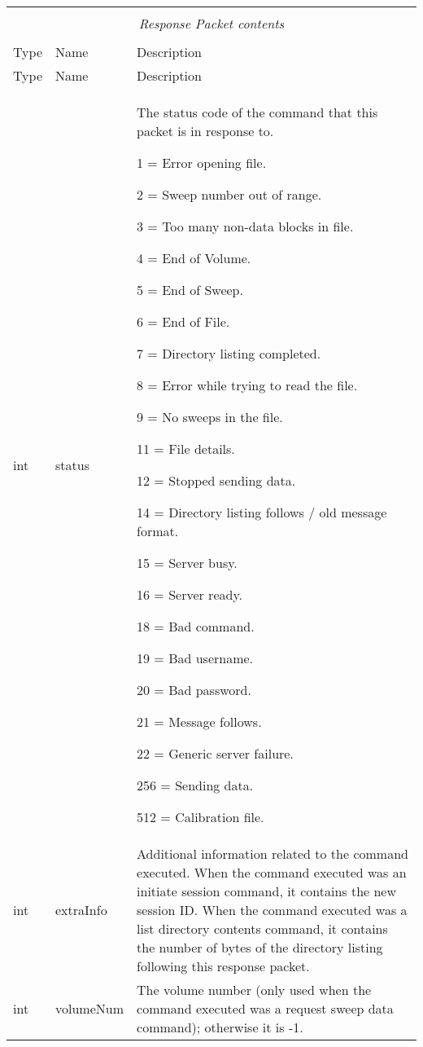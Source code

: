 \documentclass[10pt]{article}
\newcommand{\tblspc}{\rule{0pt}{3ex}}
\begin{document}
\begin{longtable}{|p{}|l|p{}|}
\hline
\multicolumn{3}{|c|}{} \\
\multicolumn{3}{|c|}{\emph{Response Packet contents}} \\
\multicolumn{3}{|c|}{} \\
\hline Type & Name & Description \\ \hline \endfirsthead
\hline Type & Name & Description \\ \hline \endhead
\hline \endfoot
\tblspc int & status & The status code of the command that this packet is in response to.
	\par 1 = Error opening file.
	\par 2 = Sweep number out of range.
	\par 3 = Too many non-data blocks in file.
	\par 4 = End of Volume.
	\par 5 = End of Sweep.
	\par 6 = End of File.
	\par 7 = Directory listing completed.
	\par 8 = Error while trying to read the file.
	\par 9 = No sweeps in the file.
	\par 11 = File details.
	\par 12 = Stopped sending data.
	\par 14 = Directory listing follows / old message format.
	\par 15 = Server busy.
	\par 16 = Server ready.
	\par 18 = Bad command.
	\par 19 = Bad username.
	\par 20 = Bad password.
	\par 21 = Message follows.
	\par 22 = Generic server failure.
	\par 256 = Sending data.
	\par 512 = Calibration file. \\
\hline
\tblspc int & extraInfo & Additional information related to the command executed. When the command executed was an initiate session command, it contains the new session ID. When the command executed was a list directory contents command, it contains the number of bytes of the directory listing following this response packet. \\
\hline
\tblspc int & volumeNum & The volume number (only used when the command executed was a request sweep data command); otherwise it is -1. \\

\end{longtable}
\end{document}
